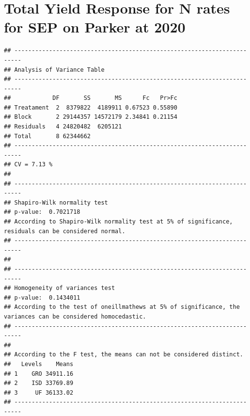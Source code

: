 \documentclass[
]{article}
\begin{document}
\hypertarget{total-yield-response-for-n-rates-for-sep-on-parker-at-2020}{%
\section{Total Yield Response for N rates for SEP on Parker at
2020}\label{total-yield-response-for-n-rates-for-sep-on-parker-at-2020}}

\begin{verbatim}
## ------------------------------------------------------------------------
## Analysis of Variance Table
## ------------------------------------------------------------------------
##            DF       SS       MS      Fc   Pr>Fc
## Treatament  2  8379822  4189911 0.67523 0.55890
## Block       2 29144357 14572179 2.34841 0.21154
## Residuals   4 24820482  6205121                
## Total       8 62344662                         
## ------------------------------------------------------------------------
## CV = 7.13 %
## 
## ------------------------------------------------------------------------
## Shapiro-Wilk normality test
## p-value:  0.7021718 
## According to Shapiro-Wilk normality test at 5% of significance, residuals can be considered normal.
## ------------------------------------------------------------------------
## 
## ------------------------------------------------------------------------
## Homogeneity of variances test
## p-value:  0.1434011 
## According to the test of oneillmathews at 5% of significance, the variances can be considered homocedastic.
## ------------------------------------------------------------------------
## 
## According to the F test, the means can not be considered distinct.
##   Levels    Means
## 1    GRO 34911.16
## 2    ISD 33769.89
## 3     UF 36133.02
## ------------------------------------------------------------------------
\end{verbatim}
\end{document}
